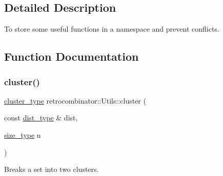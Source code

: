 \subsection{Detailed Description}
To store some useful functions in a namespace and prevent conflicts. 

\subsection{Function Documentation}
\mbox{\label{namespaceretrocombinator_1_1Utils_a03dcc302a7444a0c0897ea1b306e69ef}} 
\subsubsection{\texorpdfstring{cluster()}{cluster()}}
{\footnotesize\ttfamily \hyperlink{constants_8h_a316667a6633d664fe892bd7e0eb0141e}{cluster\+\_\+type} retrocombinator\+::\+Utils\+::cluster (\begin{DoxyParamCaption}\item[{const \hyperlink{constants_8h_aa416b6a3a9e444eae3309a16b8607750}{dist\+\_\+type} \&}]{dist,  }\item[{\hyperlink{constants_8h_a8e1541b50cee66a791df4c437ccbb385}{size\+\_\+type}}]{n }\end{DoxyParamCaption})}



Breaks a set into two clusters. 


